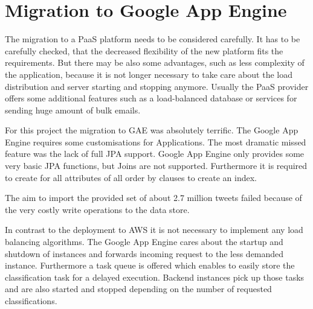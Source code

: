 \section{Migration to Google App Engine} 


The migration to a PaaS platform needs to be considered carefully. It has to be carefully checked, that the decreased flexibility of the new platform fits the requirements. But there may be also some advantages, such as less complexity of the application, because it is not longer necessary to take care about the load distribution and server starting and stopping anymore. Usually the PaaS provider offers some additional features such as a load-balanced database or services for sending huge amount of bulk emails.

For this project the migration to GAE was absolutely terrific. The Google App Engine requires some customisations for Applications. The most dramatic missed feature was the lack of full JPA support. Google App Engine only provides some very basic JPA functions, but Joins are not supported. Furthermore it is required to create for all attributes of all order by clauses to create an index. 

The aim to import the provided set of about 2.7 million tweets failed because of the very costly write operations to the data store. 

In contrast to the deployment to AWS it is not necessary to implement any load balancing algorithms. The Google App Engine cares about the startup and shutdown of instances and forwards incoming request to the less demanded instance. Furthermore a task queue is offered which enables to easily store the classification task for a delayed execution. Backend instances pick up those tasks and are also started and stopped depending on the number of requested classifications.

